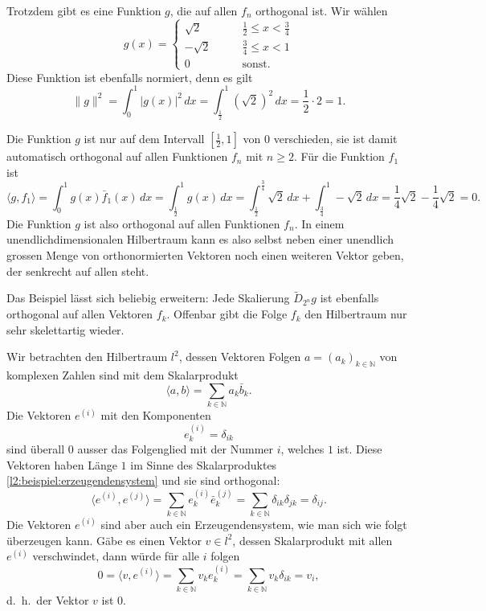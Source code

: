 \begin{beispiel}
Trotzdem gibt es eine Funktion $g$, die auf allen $f_n$ orthogonal ist.
Wir wählen
\[
g(x) = \begin{cases}
\sqrt{2}&\qquad \frac12 \le x < \frac34\\
-\sqrt{2}&\qquad \frac34 \le x < 1\\
0&\qquad\text{sonst.}
\end{cases}
\]
Diese Funktion ist ebenfalls normiert, denn es gilt
\[
\|g\|^2
=
\int_0^1 |g(x)|^2 \,dx
=
\int_{\frac12}^1 (\sqrt{2})^2\,dx
=
\frac12\cdot 2 = 1.
\]

Die Funktion $g$ ist nur auf dem Intervall $[\frac12,1]$ von $0$ verschieden,
sie ist damit automatisch orthogonal auf allen Funktionen $f_n$ mit $n\ge 2$.
Für die Funktion $f_1$ ist
\[
\langle g,f_1\rangle
=
\int_0^1 g(x)\bar{f}_1(x)\,dx
=
\int_{\frac12}^1 g(x)\,dx
=
\int_{\frac12}^{\frac34}\sqrt{2}\,dx
+
\int_{\frac34}^1-\sqrt{2}\,dx
=
\frac14 \sqrt{2} - \frac14 \sqrt{2} = 0.
\]
Die Funktion $g$ ist also orthogonal auf allen Funktionen $f_n$.
In einem unendlichdimensionalen Hilbertraum kann es also selbst
neben einer unendlich grossen Menge von orthonormierten Vektoren 
noch einen weiteren Vektor geben, der senkrecht auf allen steht.
\end{beispiel}

Das Beispiel lässt sich beliebig erweitern: Jede Skalierung
$\tilde{D}_{2^n}g$ ist ebenfalls orthogonal auf allen Vektoren $f_k$.
Offenbar gibt die Folge $f_k$ den Hilbertraum nur sehr skelettartig wieder.

\begin{beispiel}
Wir betrachten den Hilbertraum $l^2$, dessen Vektoren Folgen
$a=(a_k)_{k\in\mathbb N}$ von komplexen Zahlen sind mit dem Skalarprodukt
\begin{equation}
\langle a,b\rangle = \sum_{k\in\mathbb N} a_k\bar{b}_k.
\label{l2:beispiel:erzeugendensystem}
\end{equation}
Die Vektoren $e^{(i)}$ mit den Komponenten
\[
e^{(i)}_k = \delta_{ik}
\]
sind überall $0$ ausser das Folgenglied mit der Nummer $i$, welches $1$
ist. 
Diese Vektoren haben Länge $1$ im Sinne des Skalarproduktes
\eqref{l2:beispiel:erzeugendensystem} und sie sind orthogonal:
\[
\langle e^{(i)}, e^{(j)}\rangle
=
\sum_{k\in\mathbb N} e^{(i)}_k\bar{e}^{(j)}_k
=
\sum_{k\in\mathbb N} \delta_{ik}\delta_{jk}
=
\delta_{ij}.
\]
Die Vektoren $e^{(i)}$ sind aber auch ein Erzeugendensystem, wie man sich
wie folgt überzeugen kann.
Gäbe es einen Vektor $v\in l^2$, dessen Skalarprodukt mit allen $e^{(i)}$
verschwindet, dann würde für alle $i$ folgen
\[
0
=
\langle v,e^{(i)}\rangle
=
\sum_{k\in\mathbb N} v_ke^{(i)}_k
=
\sum_{k\in\mathbb N} v_k\delta_{ik}
=
v_i,
\]
d.~h.~der Vektor $v$ ist $0$.
\end{beispiel}

